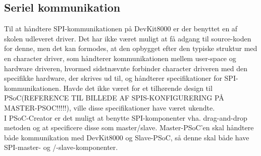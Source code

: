 \subsection{Seriel kommunikation}
Til at håndtere SPI-kommunikationen på DevKit8000 er der benyttet en af skolen udleveret driver. Det har ikke været muligt at få adgang til source-koden for denne, men det kan formodes, at den opbygget efter den typiske struktur med en character driver, som håndterer kommunikationen mellem user-space og hardware driveren, hvormed sidstnævnte forbinder character driveren med den specifikke hardware, der skrives ud til, og håndterer specifikationer for SPI-kommunikationen. Havde det ikke været for et tilhørende design til PSoC(REFERENCE TIL BILLEDE AF SPIS-KONFIGURERING PÅ MASTER-PSOC!!!!!), ville disse specifikationer have været ukendte. \\

I PSoC-Creator er det muligt at benytte SPI-komponenter vha. drag-and-drop metoden og at specificere disse som master/slave. Master-PSoC'en skal håndtere både kommunikation med DevKit8000 og Slave-PSoC, så denne skal både have SPI-master- og /-slave-komponenter.